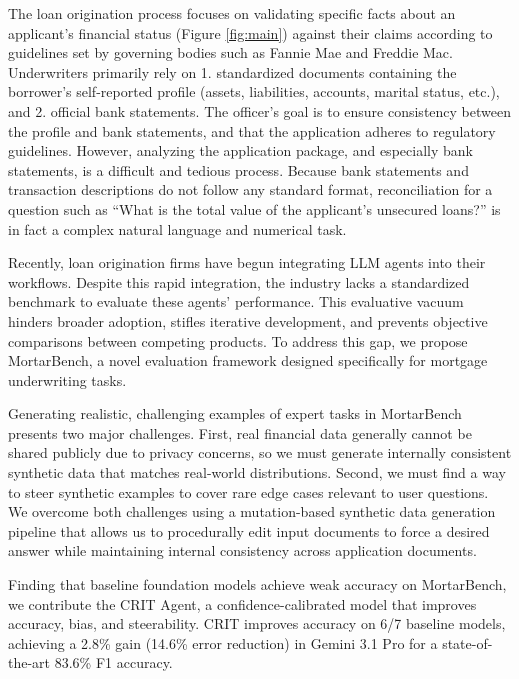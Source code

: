 \documentclass[11pt]{article}
\begin{document}
The loan origination process focuses on validating specific facts about an applicant's financial status (Figure \ref{fig:main}) against their claims according to guidelines set by governing bodies such as Fannie Mae and Freddie Mac. 
Underwriters primarily rely on 1. standardized documents containing the borrower's self-reported profile (assets, liabilities, accounts, marital status, etc.), and 2. official bank statements. 
The officer's goal is to ensure consistency between the profile and bank statements, and that the application adheres to regulatory guidelines.
However, analyzing the application package, and especially bank statements, is a difficult and tedious process.
Because bank statements and transaction descriptions do not follow any standard format, reconciliation for a question such as ``What is the total value of the applicant's unsecured loans?'' is in fact a complex natural language and numerical task.

Recently, loan origination firms have begun integrating LLM agents into their workflows.
Despite this rapid integration, the industry lacks a standardized benchmark to evaluate these agents' performance.
This evaluative vacuum hinders broader adoption, stifles iterative development, and prevents objective comparisons between competing products.
To address this gap, we propose MortarBench, a novel evaluation framework designed specifically for mortgage underwriting tasks.

Generating realistic, challenging examples of expert tasks in MortarBench presents two major challenges.
First, real financial data generally cannot be shared publicly due to privacy concerns, so we must generate internally consistent synthetic data that matches real-world distributions.
Second, we must find a way to steer synthetic examples to cover rare edge cases relevant to user questions.
We overcome both challenges using a mutation-based synthetic data generation pipeline that allows us to procedurally edit input documents to force a desired answer while maintaining internal consistency across application documents.

Finding that baseline foundation models achieve weak accuracy on MortarBench, we contribute the CRIT Agent, a confidence-calibrated model that improves accuracy, bias, and steerability.
CRIT improves accuracy on 6/7 baseline models, achieving a 2.8\% gain (14.6\% error reduction) in Gemini 3.1 Pro for a state-of-the-art 83.6\% F1 accuracy.
\end{document}
